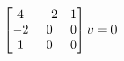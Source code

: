\documentclass[preview]{standalone}
\begin{document}
\begin{align*}
\special{dvisvgm:raw <g id='unique000'>}\begin{bmatrix}4 & -2 & 1 \\-2 & 0 & 0 \\1 & 0 & 0\end{bmatrix} v = 0\special{dvisvgm:raw </g>}
\end{align*}
\end{document}
